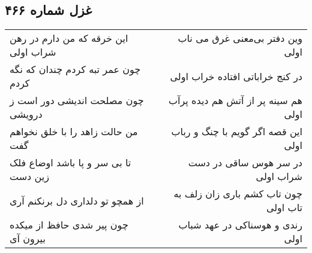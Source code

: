 \begin{center}
\section*{غزل شماره ۴۶۶}
\label{sec:sh466}
\begin{longtable}{l p{0.5cm} r}
این خرقه که من دارم در رهن شراب اولی
&&
وین دفتر بی‌معنی غرق می ناب اولی
\\
چون عمر تبه کردم چندان که نگه کردم
&&
در کنج خراباتی افتاده خراب اولی
\\
چون مصلحت اندیشی دور است ز درویشی
&&
هم سینه پر از آتش هم دیده پرآب اولی
\\
من حالت زاهد را با خلق نخواهم گفت
&&
این قصه اگر گویم با چنگ و رباب اولی
\\
تا بی سر و پا باشد اوضاع فلک زین دست
&&
در سر هوس ساقی در دست شراب اولی
\\
از همچو تو دلداری دل برنکنم آری
&&
چون تاب کشم باری زان زلف به تاب اولی
\\
چون پیر شدی حافظ از میکده بیرون آی
&&
رندی و هوسناکی در عهد شباب اولی
\\
\end{longtable}
\end{center}
